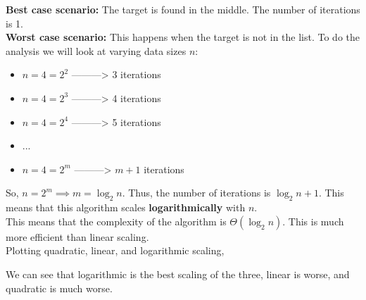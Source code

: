 \documentclass[]{article}
\begin{document}
\textbf{Best case scenario:} The target is found in the middle. The number of iterations is 1.\\


\textbf{Worst case scenario:} This happens when the target is not in the list. To do the analysis we will look at varying data sizes $n$:

\begin{itemize}
	\item $n = 4 = 2^2$ ---------> 3 iterations
	\item $n = 4 = 2^3$ ---------> 4 iterations
	\item $n = 4 = 2^4$ ---------> 5 iterations
	\item ...
	\item $n = 4 = 2^m$ ---------> $m + 1$ iterations
\end{itemize}



So, $n = 2^m \implies m = \log_2n$. Thus, the number of iterations is $\log_2n + 1$. This means that this algorithm scales \textbf{logarithmically} with $n$.\\

This means that the complexity of the algorithm is $\Theta(\log_2n)$. This is much more efficient than linear scaling.\\

Plotting quadratic, linear, and logarithmic scaling, 


\bigbreak
\begin{center}
\end{center}

We can see that logarithmic is the best scaling of the three, linear is worse, and quadratic is much worse.\\
\end{document}
